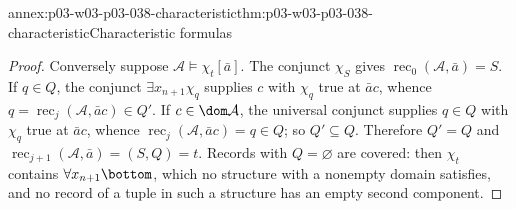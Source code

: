 \begin{annexitem}{annex:p03-w03-p03-038-characteristic}{thm:p03-w03-p03-038-characteristic}{Characteristic formulas}
\begin{proof}
Conversely suppose \(\mathcal A\models\chi_t[\bar a]\). The conjunct
\(\chi_S\) gives \(\operatorname{rec}_0(\mathcal A,\bar a)=S\). If \(q\in Q\),
the conjunct \(\exists x_{n+1}\chi_q\) supplies \(c\) with \(\chi_q\) true
at \(\bar ac\), whence \(q=\operatorname{rec}_j(\mathcal A,\bar ac)\in Q'\).
If \(c\in\dom\mathcal A\), the universal conjunct supplies \(q\in Q\) with
\(\chi_q\) true at \(\bar ac\), whence
\(\operatorname{rec}_j(\mathcal A,\bar ac)=q\in Q\); so \(Q'\subseteq Q\).
Therefore \(Q'=Q\) and \(\operatorname{rec}_{j+1}(\mathcal A,\bar a)=(S,Q)=t\).
Records with \(Q=\varnothing\) are covered: then \(\chi_t\) contains
\(\forall x_{n+1}\bottom\), which no structure with a nonempty domain
satisfies, and no record of a tuple in such a structure has an empty second
component.
\end{proof}
\end{annexitem}

